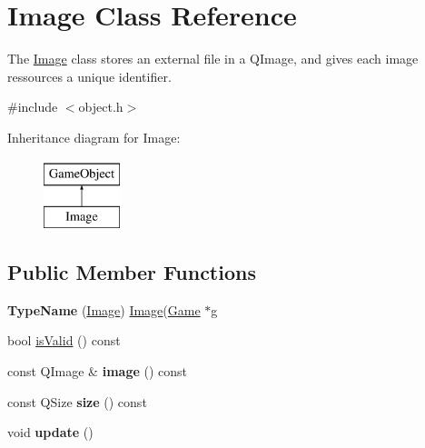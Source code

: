 \hypertarget{class_image}{\section{\-Image \-Class \-Reference}
\label{class_image}
}


\-The \hyperlink{class_image}{\-Image} class stores an external file in a \-Q\-Image, and gives each image ressources a unique identifier.  




{\ttfamily \#include $<$object.\-h$>$}

\-Inheritance diagram for \-Image\-:\begin{figure}[H]
\begin{center}
\leavevmode
\includegraphics[height=2.000000cm]{class_image}
\end{center}
\end{figure}
\subsection*{\-Public \-Member \-Functions}
\begin{DoxyCompactItemize}
\item 
\hypertarget{class_image_ad2943bbacb3aa6ddef591afa8d1b5040}{{\bfseries \-Type\-Name} (\hyperlink{class_image}{\-Image}) \hyperlink{class_image}{\-Image}(\hyperlink{class_game}{\-Game} $\ast$g}\label{class_image_ad2943bbacb3aa6ddef591afa8d1b5040}

\item 
bool \hyperlink{class_image_a0bc052fef9ea98e416e11af385cd93b4}{is\-Valid} () const 
\item 
\hypertarget{class_image_abad14459f8cc7bea0ce1b9ce1c41bad1}{const \-Q\-Image \& {\bfseries image} () const }\label{class_image_abad14459f8cc7bea0ce1b9ce1c41bad1}

\item 
\hypertarget{class_image_a62eb0299b2a5109afb31321cba7d4fc8}{const \-Q\-Size {\bfseries size} () const }\label{class_image_a62eb0299b2a5109afb31321cba7d4fc8}

\item 
\hypertarget{class_image_aa4f881e18d7b454ca185c05ec8e70b6d}{void {\bfseries update} ()}\label{class_image_aa4f881e18d7b454ca185c05ec8e70b6d}

\end{DoxyCompactItemize}
